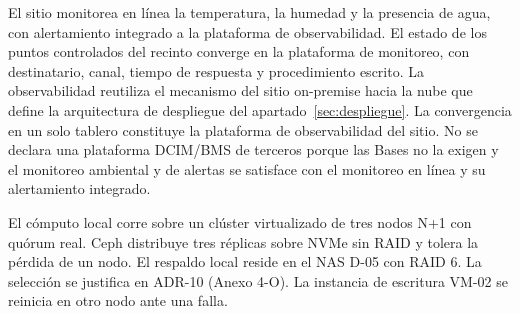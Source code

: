 El sitio monitorea en línea la temperatura, la humedad y la presencia de agua, con alertamiento integrado a la plataforma de observabilidad. El estado de los puntos controlados del recinto converge en la plataforma de monitoreo, con destinatario, canal, tiempo de respuesta y procedimiento escrito. La observabilidad reutiliza el mecanismo del sitio on-premise hacia la nube que define la arquitectura de despliegue del apartado~\ref{sec:despliegue}. La convergencia en un solo tablero constituye la plataforma de observabilidad del sitio. No se declara una plataforma DCIM/BMS de terceros porque las Bases no la exigen y el monitoreo ambiental y de alertas se satisface con el monitoreo en línea y su alertamiento integrado.

El cómputo local corre sobre un clúster virtualizado de tres nodos N+1 con quórum real. Ceph distribuye tres réplicas sobre NVMe sin RAID y tolera la pérdida de un nodo. El respaldo local reside en el NAS D-05 con RAID 6. La selección se justifica en ADR-10 (Anexo 4-O). La instancia de escritura VM-02 se reinicia en otro nodo ante una falla.

\label{fuente-05-d-sitio-principal-fin}
